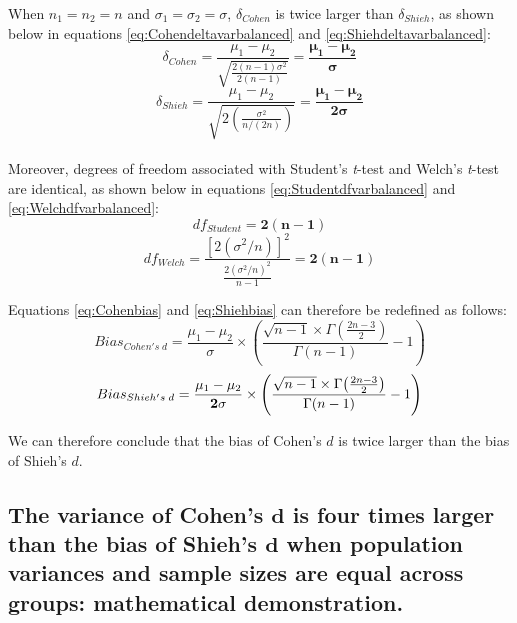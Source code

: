 \documentclass[
  english,
  man,floatsintext]{apa6}
\begin{document}
\begin{appendix}
When \(n_1=n_2=n\) and \(\sigma_1=\sigma_2=\sigma\), \(\delta_{Cohen}\)
is twice larger than \(\delta_{Shieh}\), as shown below in equations
\ref{eq:Cohendeltavarbalanced} and \ref{eq:Shiehdeltavarbalanced}:
\begin{equation} 
\delta_{Cohen}=\frac{\mu_1-\mu_2}{\sqrt{\frac{2(n-1)\sigma^2}{2(n-1)}}}=\bm{\frac{\mu_1-\mu_2}{\sigma}}
\label{eq:Cohendeltavarbalanced}
\end{equation} \begin{equation} 
\delta_{Shieh}=\frac{\mu_1-\mu_2}{\sqrt{2\left( \frac{\sigma^2}{n/(2n)}\right)}}=\bm{\frac{\mu_1-\mu_2}{2\sigma}} 
\label{eq:Shiehdeltavarbalanced}
\end{equation}\\
Moreover, degrees of freedom associated with Student's \emph{t}-test and
Welch's \emph{t}-test are identical, as shown below in equations
\ref{eq:Studentdfvarbalanced} and \ref{eq:Welchdfvarbalanced}:
\begin{equation} 
df_{Student}=\bm{2(n-1)} 
\label{eq:Studentdfvarbalanced}
\end{equation} \begin{equation} 
df_{Welch}=\frac{\left[2(\sigma^2/n)\right]^2}{\frac{2(\sigma^2/n)^2}{n-1}}= \bm{2(n-1)} 
\label{eq:Welchdfvarbalanced}
\end{equation}

Equations \ref{eq:Cohenbias} and \ref{eq:Shiehbias} can therefore be
redefined as follows: \begin{equation} 
Bias_{Cohen's \; d}=\frac{\mu_1-\mu_2}{\sigma} \times \left( \frac{\sqrt{n-1} \times \Gamma{\left(\frac{2n-3}{2}\right)}}{\Gamma{\left( n-1\right)}} -1 \right)
\label{eq:Cohenbiasvarbalanced}
\end{equation} \begin{equation} 
Bias_{Shieh's \; d}=\frac{\mu_1-\mu_2}{\bf 2\sigma} \times \left( \frac{\sqrt{n-1} \times \Gamma{\left(\frac{2n-3}{2}\right)}}{\Gamma{\left( n-1\right)}} -1 \right)
\label{eq:Shiehbiasvarbalanced}
\end{equation}

We can therefore conclude that the bias of Cohen's \(d\) is twice larger
than the bias of Shieh's \(d\).

\newpage

\hypertarget{the-variance-of-cohens-bmd-is-four-times-larger-than-the-bias-of-shiehs-bmd-when-population-variances-and-sample-sizes-are-equal-across-groups-mathematical-demonstration.}{%
\subsection{\texorpdfstring{The variance of Cohen's \(\bm{d}\) is four
times larger than the bias of Shieh's \(\bm{d}\) when population
variances and sample sizes are equal across groups: mathematical
demonstration.}{The variance of Cohen's \textbackslash bm\{d\} is four times larger than the bias of Shieh's \textbackslash bm\{d\} when population variances and sample sizes are equal across groups: mathematical demonstration.}}\label{the-variance-of-cohens-bmd-is-four-times-larger-than-the-bias-of-shiehs-bmd-when-population-variances-and-sample-sizes-are-equal-across-groups-mathematical-demonstration.}}


\end{appendix}
\end{document}
